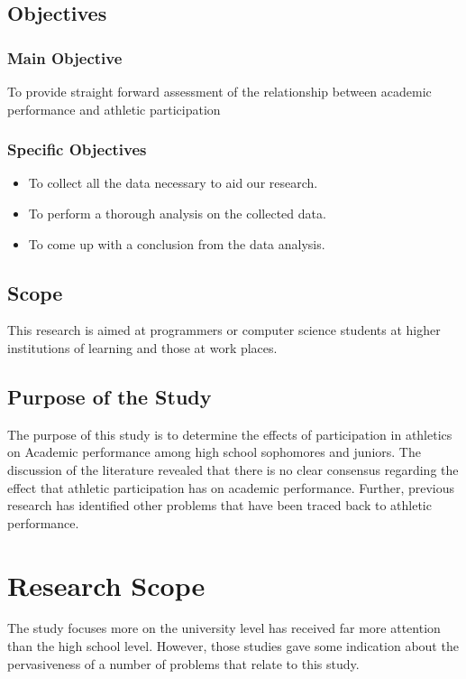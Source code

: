 \documentclass[options]{article}
\begin{document}
\subsection{\textbf{Objectives}}


\subsubsection{\textbf{Main Objective}} 
 To provide straight forward assessment of the relationship between academic performance and athletic participation




\subsubsection{\textbf{Specific Objectives}}

\begin{itemize}
  \item To collect all the data necessary to aid our research.
  \item To perform a thorough analysis on the collected data.
  \item To come up with a conclusion from the data analysis.
\end{itemize}


\subsection{\textbf{Scope}}
This research is aimed at programmers or computer science students at higher institutions of learning and those at work places.

\subsection{\textbf{Purpose of the Study}}
The purpose of this study is to determine the effects of participation in athletics on
Academic performance among high school sophomores and juniors. The discussion of the literature revealed that there is no clear consensus regarding the effect that athletic participation has on academic performance. Further, previous research has identified other problems that have been traced back to athletic performance.

\section{\textbf{Research Scope}}
The study focuses more on the university level has received far more attention than the high school level. However, those studies gave some indication about the pervasiveness of a number of problems that relate to this study.
\end{document}
